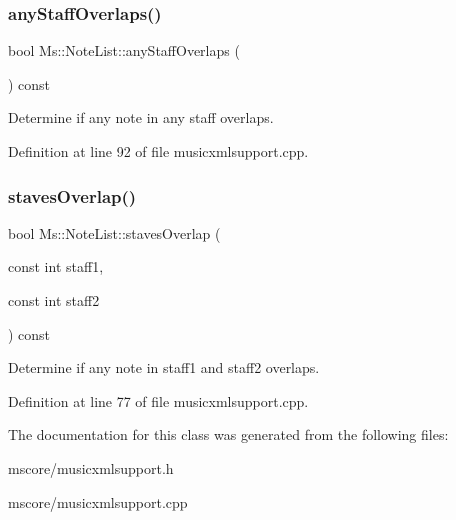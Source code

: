 \subsubsection{\texorpdfstring{any\+Staff\+Overlaps()}{anyStaffOverlaps()}}
{\footnotesize\ttfamily bool Ms\+::\+Note\+List\+::any\+Staff\+Overlaps (\begin{DoxyParamCaption}{ }\end{DoxyParamCaption}) const}

Determine if any note in any staff overlaps. 

Definition at line 92 of file musicxmlsupport.\+cpp.

\mbox{\label{class_ms_1_1_note_list_aef910717b2f1d6843845a86456aa8df0}} 
\subsubsection{\texorpdfstring{staves\+Overlap()}{stavesOverlap()}}
{\footnotesize\ttfamily bool Ms\+::\+Note\+List\+::staves\+Overlap (\begin{DoxyParamCaption}\item[{const int}]{staff1,  }\item[{const int}]{staff2 }\end{DoxyParamCaption}) const}

Determine if any note in staff1 and staff2 overlaps. 

Definition at line 77 of file musicxmlsupport.\+cpp.



The documentation for this class was generated from the following files\+:\begin{DoxyCompactItemize}
\item 
mscore/musicxmlsupport.\+h\item 
mscore/musicxmlsupport.\+cpp\end{DoxyCompactItemize}

